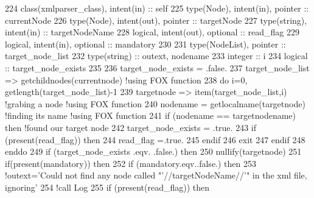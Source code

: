 \begin{DoxyCode}
224     \textcolor{keywordtype}{class}(xmlparser\_class), \textcolor{keywordtype}{intent(in)} :: self
225     \textcolor{keywordtype}{type}(Node), \textcolor{keywordtype}{intent(in)}, \textcolor{keywordtype}{pointer} :: currentNode
226     \textcolor{keywordtype}{type}(Node), \textcolor{keywordtype}{intent(out)}, \textcolor{keywordtype}{pointer} :: targetNode
227     \textcolor{keywordtype}{type}(string), \textcolor{keywordtype}{intent(in)} :: targetNodeName
228     \textcolor{keywordtype}{logical}, \textcolor{keywordtype}{intent(out)}, \textcolor{keywordtype}{optional} :: read\_flag
229     \textcolor{keywordtype}{logical}, \textcolor{keywordtype}{intent(in)}, \textcolor{keywordtype}{optional} :: mandatory
230 
231     \textcolor{keywordtype}{type}(NodeList), \textcolor{keywordtype}{pointer} :: target\_node\_list
232     \textcolor{keywordtype}{type}(string) :: outext, nodename
233     \textcolor{keywordtype}{integer} :: i
234     \textcolor{keywordtype}{logical} :: target\_node\_exists
235 
236     target\_node\_exists = .false.
237     target\_node\_list => getchildnodes(currentnode) \textcolor{comment}{!using FOX function}
238     \textcolor{keywordflow}{do} i=0, getlength(target\_node\_list)-1
239         targetnode => item(target\_node\_list,i) \textcolor{comment}{!grabing a node !using FOX function}
240         nodename = getlocalname(targetnode)  \textcolor{comment}{!finding its name !using FOX function}
241         \textcolor{keywordflow}{if} (nodename == targetnodename) \textcolor{keywordflow}{then} \textcolor{comment}{!found our target node}
242             target\_node\_exists = .true.
243             \textcolor{keywordflow}{if} (\textcolor{keyword}{present}(read\_flag)) \textcolor{keywordflow}{then}
244                 read\_flag =.true.
245 \textcolor{keywordflow}{            endif}
246             \textcolor{keywordflow}{exit}
247 \textcolor{keywordflow}{        endif}
248 \textcolor{keywordflow}{    enddo}
249     \textcolor{keywordflow}{if} (target\_node\_exists .eqv. .false.) \textcolor{keywordflow}{then}
250         \textcolor{keyword}{nullify}(targetnode)
251         \textcolor{keywordflow}{if}(\textcolor{keyword}{present}(mandatory)) \textcolor{keywordflow}{then}
252             \textcolor{keywordflow}{if} (mandatory.eqv..false.) \textcolor{keywordflow}{then}
253                 \textcolor{comment}{!outext='Could not find any node called "'//targetNodeName//'" in the xml file, ignoring'}
254                 \textcolor{comment}{!call Log%
255                 \textcolor{keywordflow}{if} (\textcolor{keyword}{present}(read\_flag)) \textcolor{keywordflow}{then}
}
\end{DoxyCode}
